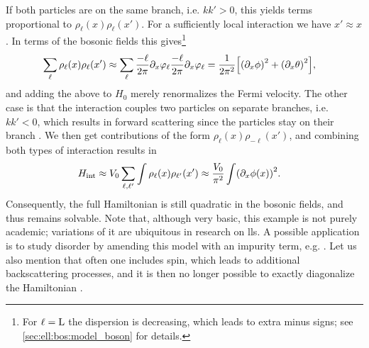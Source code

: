 If both particles are on the same branch, i.e. $kk'>0$, this yields terms proportional to $\rho_\ell(x) \rho_\ell(x')$.
For a sufficiently local interaction we have $x'\approx x$.
In terms of the bosonic fields this gives\footnote{For $\ell=\text{L}$ the dispersion is decreasing, which leads to extra minus signs; see \autoref{sec:ell:bos:model_boson} for details.}
\begin{align*}
\sum_\ell \rho_\ell(x) \rho_\ell(x') &\approx \sum_\ell \frac{-\ell}{2\pi} \partial_x\varphi_\ell \frac{-\ell}{2\pi} \partial_x\varphi_\ell = \frac{1}{2\pi^2} \klb*{\kla*{\partial_x\phi}^2 + \kla*{\partial_x\theta}^2},
\end{align*}
and adding the above to $H_0$ merely renormalizes the Fermi velocity.
The other case is that the interaction couples two particles on separate branches, i.e. $kk'<0$, which results in forward scattering since the particles stay on their branch \cite[]{Giamarchi_2004}.
We then get contributions of the form $\rho_\ell(x) \rho_{-\ell}(x')$, and combining both types of interaction results in
\begin{align*}
H_\tint &\approx V_0 \sum_{\ell,\ell'} \int \rho_\ell(x) \rho_{\ell'}(x') \approx \frac{V_0}{\pi^2} \int \kla*{\partial_x\phi(x)}^2.
\end{align*}
Consequently, the full Hamiltonian is still quadratic in the bosonic fields, and thus remains solvable.
Note that, although very basic, this example is not purely academic; variations of it are ubiquitous in research on \glspl{ll}.
A possible application is to study disorder by amending this model with an impurity term, e.g. \cite{QImpurity_review_Furusaki_2005,QImpurity_LL_Rylands_2016,Helical_Rashba_SpinOrbit_QSH_Stroem_2010,Helical_RashbaImp_RG_Crepin_2012}.
Let us also mention that often one includes spin, which leads to additional backscattering processes, and it is then no longer possible to exactly diagonalize the Hamiltonian \cite[]{Giamarchi_2004}.
